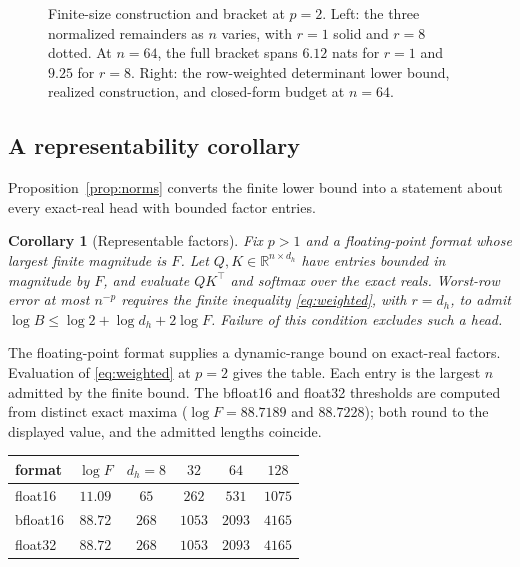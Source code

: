 \documentclass[10pt]{article}
\newtheorem{corollary}[theorem]{Corollary}
\theoremstyle{definition}
\newcommand{\R}{\mathbb R}
\begin{document}
\begin{figure}[H]
\caption{Finite-size construction and bracket at \(p=2\).  Left: the three
normalized remainders as \(n\) varies, with \(r=1\) solid and \(r=8\) dotted.
At \(n=64\), the full bracket spans \(6.12\) nats for \(r=1\) and \(9.25\)
for \(r=8\).  Right: the row-weighted determinant lower bound, realized
construction, and closed-form budget at \(n=64\).}
\label{fig:bracket}
\end{figure}

\subsection{A representability corollary}

Proposition~\ref{prop:norms} converts the finite lower bound into a statement
about every exact-real head with bounded factor entries.

\begin{corollary}[Representable factors]\label{cor:precision}
Fix \(p>1\) and a floating-point format whose largest finite magnitude is
\(F\).  Let \(Q,K\in\R^{n\times d_h}\) have entries bounded in magnitude by
\(F\), and evaluate \(QK^\top\) and softmax over the exact reals.  Worst-row
error at most \(n^{-p}\) requires the finite inequality
\eqref{eq:weighted}, with \(r=d_h\), to admit
\(\log B\le\log 2+\log d_h+2\log F\).  Failure of this condition excludes
such a head.
\end{corollary}

The floating-point format supplies a dynamic-range bound on exact-real factors.
Evaluation of \eqref{eq:weighted} at \(p=2\) gives the table.  Each entry is
the largest \(n\) admitted by the finite bound.  The bfloat16 and float32
thresholds are computed from distinct exact maxima (\(\log F=88.7189\) and
\(88.7228\)); both round to the displayed value, and the admitted lengths
coincide.

\begin{center}
\begin{tabular}{lccccc}
\toprule
format & \(\log F\) & \(d_h=8\) & \(32\) & \(64\) & \(128\) \\
\midrule
float16          & \(11.09\) & \(65\)  & \(262\)  & \(531\)  & \(1075\) \\
bfloat16         & \(88.72\) & \(268\) & \(1053\) & \(2093\) & \(4165\) \\
float32          & \(88.72\) & \(268\) & \(1053\) & \(2093\) & \(4165\) \\
\bottomrule
\end{tabular}
\end{center}
\end{document}
